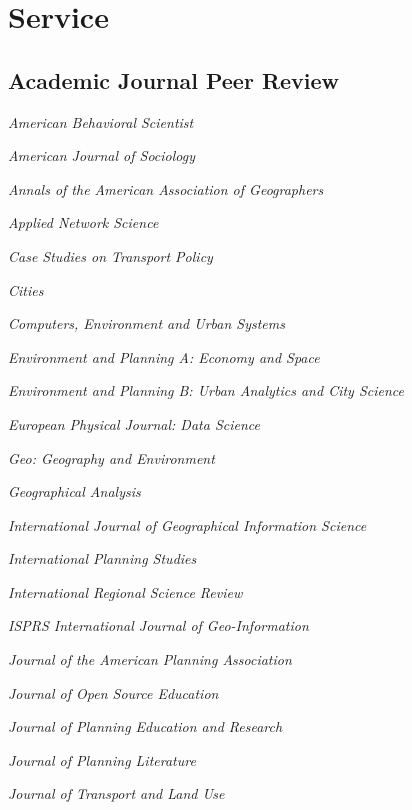 \documentclass[12pt,letterpaper]{report}
\newcommand{\listitemspace}{0.25em}
\renewenvironment{itemize}
{\begin{list}{}{\setlength{\leftmargin}{0em}
                \setlength{\parskip}{0em}
                \setlength{\itemsep}{\listitemspace}
                \setlength{\parsep}{\listitemspace}}}
{\end{list}}
\begin{document}
    \section*{Service}

    \subsection*{Academic Journal Peer Review}

    \begin{itemize}

        \item \textit{American Behavioral Scientist}
        \item \textit{American Journal of Sociology}
        \item \textit{Annals of the American Association of Geographers}
        \item \textit{Applied Network Science}
        \item \textit{Case Studies on Transport Policy}
        \item \textit{Cities}
        \item \textit{Computers, Environment and Urban Systems}
        \item \textit{Environment and Planning A: Economy and Space}
        \item \textit{Environment and Planning B: Urban Analytics and City Science}
        \item \textit{European Physical Journal: Data Science}
        \item \textit{Geo: Geography and Environment}
        \item \textit{Geographical Analysis}
        \item \textit{International Journal of Geographical Information Science}
        \item \textit{International Planning Studies}
        \item \textit{International Regional Science Review}
        \item \textit{ISPRS International Journal of Geo-Information}
        \item \textit{Journal of the American Planning Association}
        \item \textit{Journal of Open Source Education}
        \item \textit{Journal of Planning Education and Research}
        \item \textit{Journal of Planning Literature}
        \item \textit{Journal of Transport and Land Use}

\end{itemize}
\end{document}
